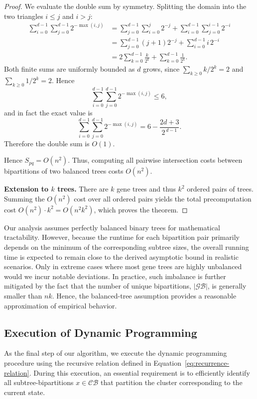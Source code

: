 \documentclass[10pt,a4paper]{article}
\begin{document}
\begin{proof}
We evaluate the double sum by symmetry. Splitting the domain into the two
triangles \(i\le j\) and \(i>j\):
\begin{align*}
\sum_{i=0}^{d-1}\sum_{j=0}^{d-1}2^{-\max(i,j)}
&=\sum_{j=0}^{d-1}\sum_{i=0}^{j}2^{-j}
  +\sum_{i=0}^{d-1}\sum_{j=0}^{i-1}2^{-i} \\[4pt]
&=\sum_{j=0}^{d-1}(j+1)2^{-j}
  +\sum_{i=0}^{d-1}i\,2^{-i} \\[4pt]
&=2\sum_{k=0}^{d-1}\frac{k}{2^{k}}
  +\sum_{k=0}^{d-1}\frac{1}{2^{k}}.
\end{align*}
Both finite sums are uniformly bounded as \(d\) grows, since
\(\sum_{k\ge0}k/2^{k}=2\) and \(\sum_{k\ge0}1/2^{k}=2\).
Hence
\[
\sum_{i=0}^{d-1}\sum_{j=0}^{d-1}2^{-\max(i,j)} \le 6,
\]
and in fact the exact value is
\[
\sum_{i=0}^{d-1}\sum_{j=0}^{d-1}2^{-\max(i,j)}
=6-\frac{2d+3}{2^{\,d-1}}.
\]
Therefore the double sum is \(O(1)\).




Hence \(S_{pq}=O(n^{2})\). Thus, computing all pairwise
intersection costs between bipartitions of two balanced trees costs
\(O(n^{2})\).

\textbf{Extension to $k$ trees.}
There are \(k\) gene trees and thus \(k^{2}\) ordered pairs of trees.
Summing the \(O(n^{2})\) cost over all ordered pairs yields the
total precomputation cost
\(O(n^{2})\cdot k^{2}=O(n^{2}k^{2})\), which proves the theorem.
\end{proof}

Our analysis assumes perfectly balanced binary trees for mathematical tractability. However, because the runtime for each bipartition pair primarily depends on the minimum of the corresponding subtree sizes, the overall running time is expected to remain close to the derived asymptotic bound in realistic scenarios. Only in extreme cases where most gene trees are highly unbalanced would we incur notable deviations. In practice, such imbalance is further mitigated by the fact that the number of unique bipartitions, $|\mathcal{GB}|$, is generally smaller than $nk$. Hence, the balanced-tree assumption provides a reasonable approximation of empirical behavior.

\subsection{Execution of Dynamic Programming}
\label{subsec:dp}

As the final step of our algorithm, we execute the dynamic programming procedure using the recursive relation defined in Equation~\eqref{eq:recurrence-relation}. During this execution, an essential requirement is to efficiently identify all subtree-bipartitions $x \in \mathcal{CB}$ that partition the cluster corresponding to the current state.  
\end{document}
